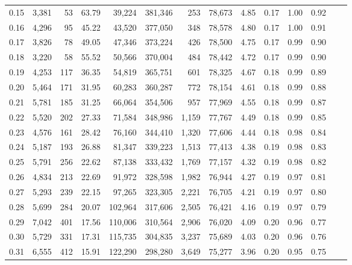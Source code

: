 \begin{tabular}{rrrrrrrrrrrrrr}
0.15 &  3,381 &     53 &    63.79 &   39,224 &  381,346 &     253 &  78,673 &  4.85 &  0.17 &  1.00 &      0.92 \\
0.16 &  4,296 &     95 &    45.22 &   43,520 &  377,050 &     348 &  78,578 &  4.80 &  0.17 &  1.00 &      0.91 \\
0.17 &  3,826 &     78 &    49.05 &   47,346 &  373,224 &     426 &  78,500 &  4.75 &  0.17 &  0.99 &      0.90 \\
0.18 &  3,220 &     58 &    55.52 &   50,566 &  370,004 &     484 &  78,442 &  4.72 &  0.17 &  0.99 &      0.90 \\
0.19 &  4,253 &    117 &    36.35 &   54,819 &  365,751 &     601 &  78,325 &  4.67 &  0.18 &  0.99 &      0.89 \\
0.20 &  5,464 &    171 &    31.95 &   60,283 &  360,287 &     772 &  78,154 &  4.61 &  0.18 &  0.99 &      0.88 \\
0.21 &  5,781 &    185 &    31.25 &   66,064 &  354,506 &     957 &  77,969 &  4.55 &  0.18 &  0.99 &      0.87 \\
0.22 &  5,520 &    202 &    27.33 &   71,584 &  348,986 &   1,159 &  77,767 &  4.49 &  0.18 &  0.99 &      0.85 \\
0.23 &  4,576 &    161 &    28.42 &   76,160 &  344,410 &   1,320 &  77,606 &  4.44 &  0.18 &  0.98 &      0.84 \\
0.24 &  5,187 &    193 &    26.88 &   81,347 &  339,223 &   1,513 &  77,413 &  4.38 &  0.19 &  0.98 &      0.83 \\
0.25 &  5,791 &    256 &    22.62 &   87,138 &  333,432 &   1,769 &  77,157 &  4.32 &  0.19 &  0.98 &      0.82 \\
0.26 &  4,834 &    213 &    22.69 &   91,972 &  328,598 &   1,982 &  76,944 &  4.27 &  0.19 &  0.97 &      0.81 \\
0.27 &  5,293 &    239 &    22.15 &   97,265 &  323,305 &   2,221 &  76,705 &  4.21 &  0.19 &  0.97 &      0.80 \\
0.28 &  5,699 &    284 &    20.07 &  102,964 &  317,606 &   2,505 &  76,421 &  4.16 &  0.19 &  0.97 &      0.79 \\
0.29 &  7,042 &    401 &    17.56 &  110,006 &  310,564 &   2,906 &  76,020 &  4.09 &  0.20 &  0.96 &      0.77 \\
0.30 &  5,729 &    331 &    17.31 &  115,735 &  304,835 &   3,237 &  75,689 &  4.03 &  0.20 &  0.96 &      0.76 \\
0.31 &  6,555 &    412 &    15.91 &  122,290 &  298,280 &   3,649 &  75,277 &  3.96 &  0.20 &  0.95 &      0.75 \\

\end{tabular}
